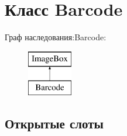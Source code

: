 \hypertarget{class_barcode}{\section{Класс \-Barcode}
\label{class_barcode}
}
Граф наследования\-:\-Barcode\-:\begin{figure}[H]
\begin{center}
\leavevmode
\includegraphics[height=2.000000cm]{class_barcode}
\end{center}
\end{figure}
\subsection*{Открытые слоты}
